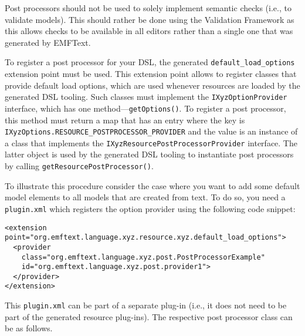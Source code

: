 Post processors should not be used to solely implement semantic checks (i.e.,
to validate models). This should rather be done using the \EMF Validation
Framework as this allows checks to be available in all editors rather than a
single one that was generated by EMFText.

To register a post processor for your DSL, the generated 
\texttt{default\_load\_options} extension point must be used. This extension
point allows to register classes that provide default load options, which are
used whenever resources are loaded by the generated DSL tooling. Such classes
must implement the \texttt{IXyzOptionProvider} interface, which has one
method---\texttt{getOptions()}. To register a post processor, this method must
return a map that has an entry where the key is
\texttt{IXyzOptions.RESOURCE\_POSTPROCESSOR\_PROVIDER} and the value is an
instance of a class that implements the
\texttt{IXyzResourcePostProcessorProvider} interface. The latter object is used
by the generated DSL tooling to instantiate post processors by calling
\texttt{getResourcePostProcessor()}.

To illustrate this procedure consider the case where you want to add some
default model elements to all models that are created from text. To do so, you
need a \texttt{plugin.xml} which registers the option provider using the
following code snippet:

\begin{lstlisting}
<extension point="org.emftext.language.xyz.resource.xyz.default_load_options">
  <provider
    class="org.emftext.language.xyz.post.PostProcessorExample"
    id="org.emftext.language.xyz.post.provider1">
  </provider>
</extension>
\end{lstlisting}

This \texttt{plugin.xml} can be part of a separate plug-in (i.e., it does not
need to be part of the generated resource plug-ins). The respective post
processor class can be as follows.

